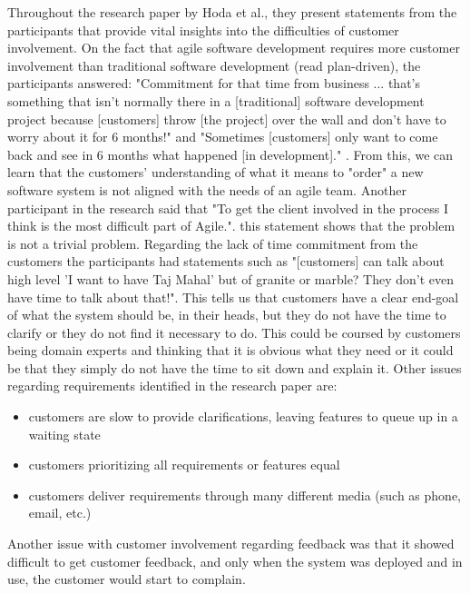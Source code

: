 Throughout the research paper by Hoda et al., they present statements from the participants that provide vital insights into the difficulties of customer involvement. On the fact that agile software development requires more customer involvement than traditional software development (read plan-driven), the participants answered: "Commitment for that time from business ... that's something that isn't normally there in a [traditional] software development project because [customers] throw [the project] over the wall and don't have to worry about it for 6 months!" and "Sometimes [customers] only want to come back and see in 6 months what happened [in development]." \cite{Hoda2011TheIO}. From this, we can learn that the customers' understanding of what it means to "order" a new software system is not aligned with the needs of an agile team. Another participant in the research said that "To get the client involved in the process I think is the most difficult part of Agile.\cite{Hoda2011TheIO}". this statement shows that the problem is not a trivial problem. Regarding the lack of time commitment from the customers the participants had statements such as "[customers] can talk about high level 'I want to have Taj Mahal' but of granite or marble? They don't even have time to talk about that!\cite{Hoda2011TheIO}". This tells us that customers have a clear end-goal of what the system should be, in their heads, but they do not have the time to clarify or they do not find it necessary to do. This could be coursed by customers being domain experts and thinking that it is obvious what they need or it could be that they simply do not have the time to sit down and explain it. Other issues regarding requirements identified in the research paper are:
\begin{itemize}
 \item customers are slow to provide clarifications, leaving features to queue up in a waiting state
 \item customers prioritizing all requirements or features equal
 \item customers deliver requirements through many different media (such as phone, email, etc.)
\end{itemize}

Another issue with customer involvement regarding feedback was that it showed difficult to get customer feedback, and only when the system was deployed and in use, the customer would start to complain.


